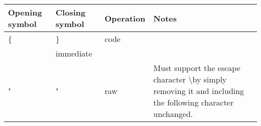 \begin{longtable}{ | l | l | l | X | }
\hline
\textbf{Opening symbol} & \textbf{Closing symbol} & \textbf{Operation} & \textbf{Notes} \\
\hline
\hline
\{ & \} & code & \\
\hline
[ & ] & immediate & \\
\hline
" & " & raw & Must support the escape character \textbackslash by simply removing it and including the following character unchanged. \\
\hline
\end{longtable}
